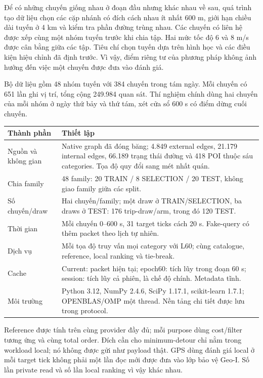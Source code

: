 Để có những chuyến giống nhau ở đoạn đầu nhưng khác nhau về sau, quá trình tạo dữ liệu chọn các cặp nhánh có đích cách nhau ít nhất 600 m, giới hạn chiều dài tuyến ở 4 km và kiểm tra phần đường trùng nhau. Các chuyến có liên hệ được xếp cùng một nhóm tuyến trước khi chia tập. Hai mức tốc độ 6 và 8 m/s được cân bằng giữa các tập. Tiêu chí chọn tuyến dựa trên hình học và các điều kiện hiệu chỉnh đã định trước. Vì vậy, điểm riêng tư của phương pháp không ảnh hưởng đến việc một chuyến được đưa vào đánh giá.

Bộ dữ liệu gồm 48 nhóm tuyến với 384 chuyến trong tám ngày. Mỗi chuyến có 651 lần ghi vị trí, tổng cộng 249.984 quan sát. Thí nghiệm chính dùng hai chuyến của mỗi nhóm ở ngày thứ bảy và thứ tám, xét cửa sổ 600 s có điểm dừng cuối chuyến.

\noindent\begin{tabularx}{\linewidth}{@{}P{4.2cm}Y@{}}\toprule
\textbf{Thành phần} & \textbf{Thiết lập}\\\midrule
Nguồn và không gian & Native graph đã đóng băng; 4.849 external edges, 21.179 internal edges, 66.189 trạng thái đường và 418 POI thuộc sáu categories. Tọa độ quy đổi sang mét nhất quán.\\
Chia family & 48 family: 20 TRAIN / 8 SELECTION / 20 TEST, không giao family giữa các split.\\
Số chuyến/draw & Hai chuyến/family; một draw ở TRAIN/SELECTION, ba draws ở TEST: 176 trip-draw/arm, trong đó 120 TEST.\\
Thời gian & Mỗi chuyến 0--600 s, 31 target ticks cách 20 s. Fake-query có thêm packet theo lịch tự nhiên.\\
Dịch vụ & Mỗi tọa độ truy vấn mọi category với L60; cùng catalogue, reference, local ranking và tie-break.\\
Cache & Current: packet hiện tại; epoch60: tích lũy trong đoạn 60 s; session: tích lũy cả phiên, là chế độ chính. Metadata tĩnh.\\
Môi trường & Python 3.12, NumPy 2.4.6, SciPy 1.17.1, scikit-learn 1.7.1; OPENBLAS/OMP một thread. Nền tảng chi tiết được lưu trong protocol.\\\bottomrule
\end{tabularx}

Reference được tính trên cùng provider đầy đủ; mỗi purpose dùng cost/filter tương ứng và cùng total order.
Đích cần cho minimum-detour chỉ nằm trong workload local; nó không được gửi như payload thật.
GPS dùng đánh giá local ở mỗi target tick không phải một lần đọc mới được đưa vào lớp bảo vệ Geo-I.
Số lần private read và số lần local ranking vì vậy khác nhau.

